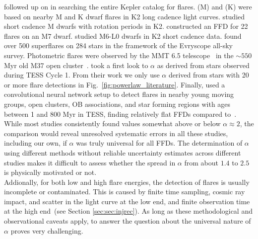 \documentclass{aa}
\begin{document}
       \citet{yang_flaring_2017} followed up on \citet{davenport_kepler_2016} in searching the entire Kepler catalog for flares. \citet{lin2019} (M) and (K) were based on nearby M and K dwarf flares in K2 long cadence light curves. \citet{raetz2020} studied short cadence M dwarfs with rotation periods in K2. \citet{gizis_k2_2017-1} constructed an FFD for 22 flares on an M7 dwarf. \citet{paudel2018} studied M6-L0 dwarfs in K2 short cadence data. \citet{howard2019} found over 500 superflares on 284 stars in the framework of the Evryscope all-sky survey. Photometric flares were observed by the MMT 6.5 telescope~\citep{hartman2008} in the $\sim550$ Myr old M37 open cluster~\citep{chang2015}. \citet{guenther2020} took a first look to $\alpha$ as derived from stars observed during TESS Cycle 1. From their work we only use $\alpha$ derived from stars with 20 or more flare detections in Fig.~\ref{fig:powerlaw_literature}. Finally, \citet{feinstein2020} used a convolutional neural network setup to detect flares in nearby young moving groups, open clusters, OB associations, and star forming regions with ages between 1 and 800 Myr in TESS, finding relatively flat FFDs compared to~\citet{guenther2020}.
       \\
While most studies consistently found values somewhat above or below $\alpha\approx2$, the comparison would reveal unresolved systematic errors in all these studies, including our own, if $\alpha$ was truly universal for all FFDs. The determination of $\alpha$ using different methods without reliable uncertainty estimates across different studies makes it difficult to assess whether the spread in $\alpha$ from about $1.4$ to $2.5$ is physically motivated or not. 
\\
Addionally, for both low and high flare energies, the detection of flares is usually incomplete or contaminated. This is caused by finite time sampling, cosmic ray impact, and scatter in the light curve at the low end, and finite observation time at the high end~(see Section \ref{sec:sec:injrec}). As long as these methodological and observational caveats apply, to answer the question about the universal nature of $\alpha$ proves very challenging.
\end{document}
